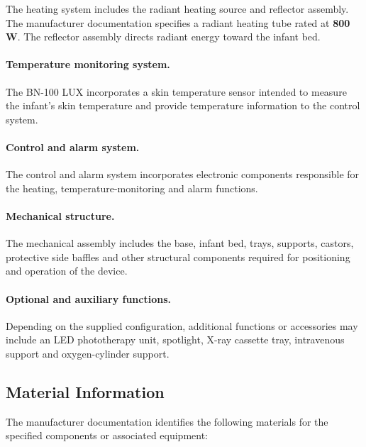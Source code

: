 The heating system includes the radiant heating source and reflector
assembly. The manufacturer documentation specifies a radiant heating
tube rated at \textbf{800 W}. The reflector assembly directs radiant
energy toward the infant bed.

\paragraph{Temperature monitoring system.}

The BN-100 LUX incorporates a skin temperature sensor intended to
measure the infant's skin temperature and provide temperature
information to the control system.

\paragraph{Control and alarm system.}

The control and alarm system incorporates electronic components
responsible for the heating, temperature-monitoring and alarm
functions.

\paragraph{Mechanical structure.}

The mechanical assembly includes the base, infant bed, trays,
supports, castors, protective side baffles and other structural
components required for positioning and operation of the device.

\paragraph{Optional and auxiliary functions.}

Depending on the supplied configuration, additional functions or
accessories may include an LED phototherapy unit, spotlight,
X-ray cassette tray, intravenous support and oxygen-cylinder
support.


\subsection*{Material Information}

The manufacturer documentation identifies the following materials
for the specified components or associated equipment:

